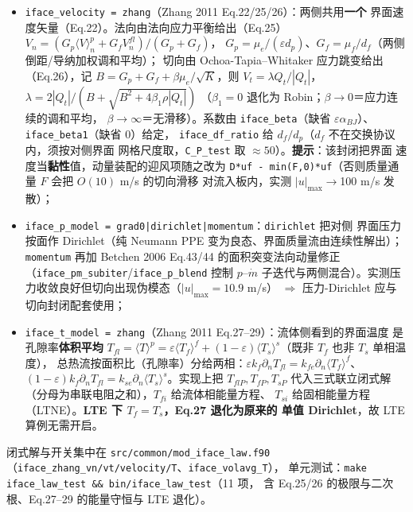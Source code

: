 \documentclass[11pt,a4paper]{ctexart}
\begin{document}
\begin{itemize}\itemsep3pt
  \item \texttt{iface\_velocity = zhang}（Zhang 2011 Eq.22/25/26）：两侧共用\textbf{一个}
        界面速度矢量（Eq.22）。法向由法向应力平衡给出（Eq.25）
        $V_n=(G_p\langle V\rangle_n^p+G_fV_n^{fl})/(G_p+G_f)$，
        $G_p=\mu_e/(\varepsilon d_p)$、$G_f=\mu_f/d_f$（两侧倒距/导纳加权调和平均）；
        切向由 Ochoa-Tapia--Whitaker 应力跳变给出（Eq.26），记
        $B=G_p+G_f+\beta\mu_e/\sqrt K$，则 $V_t=\lambda Q_t/|Q_t|$，
        $\lambda=2|Q_t|/(B+\sqrt{B^2+4\beta_1\rho|Q_t|})$
        （$\beta_1=0$ 退化为 Robin；$\beta\to0$＝应力连续的调和平均，
        $\beta\to\infty$＝无滑移）。系数由 \texttt{iface\_beta}（缺省
        $\varepsilon\alpha_{BJ}$）、\texttt{iface\_beta1}（缺省 0）给定，
        \texttt{iface\_df\_ratio} 给 $d_f/d_p$（$d_f$ 不在交换协议内，须按对侧界面
        网格尺度取，\texttt{C\_P\_test} 取 $\approx50$）。\textbf{提示}：该封闭把界面
        速度当\textbf{黏性}值，动量装配的迎风项随之改为
        \texttt{D*uf - min(F,0)*uf}（否则质量通量 $F$ 会把 $O(10)$ m/s 的切向滑移
        对流入板内，实测 $|u|_{\max}\to$100 m/s 发散）；
  \item \texttt{iface\_p\_model = grad0|dirichlet|momentum}：\texttt{dirichlet} 把对侧
        界面压力按面作 Dirichlet（纯 Neumann PPE 变为良态、界面质量流由连续性解出）；
        \texttt{momentum} 再加 Betchen 2006 Eq.43/44 的面积突变法向动量修正
        （\texttt{iface\_pm\_subiter}/\texttt{iface\_p\_blend} 控制 $p$--$\dot m$
        子迭代与两侧混合）。实测压力收敛良好但切向出现伪模态（$|u|_{\max}=10.9$ m/s）
        $\Rightarrow$ 压力-Dirichlet 应与切向封闭配套使用；
  \item \texttt{iface\_t\_model = zhang}（Zhang 2011 Eq.27--29）：流体侧看到的界面温度
        是孔隙率\textbf{体积平均}
        $T_{fl}=\langle T\rangle^p=\varepsilon\langle T_f\rangle^f
        +(1-\varepsilon)\langle T_s\rangle^s$（既非 $T_f$ 也非 $T_s$ 单相温度），
        总热流按面积比（孔隙率）分给两相：$\varepsilon k_f\partial_nT_{fl}
        =k_{fe}\partial_n\langle T_f\rangle^f$、$(1-\varepsilon)k_f\partial_nT_{fl}
        =k_{se}\partial_n\langle T_s\rangle^s$。实现上把 $T_{flP},T_{fP},T_{sP}$
        代入三式联立闭式解（分母为串联电阻之和），$T_{fi}$ 给流体相能量方程、
        $T_{si}$ 给固相能量方程（LTNE）。\textbf{LTE 下 $T_f=T_s$，Eq.27 退化为原来的
        单值 Dirichlet}，故 LTE 算例无需开启。
\end{itemize}

闭式解与开关集中在 \texttt{src/common/mod\_iface\_law.f90}
（\texttt{iface\_zhang\_vn/vt/velocity/T}、\texttt{iface\_volavg\_T}），
单元测试：\texttt{make iface\_law\_test \&\& bin/iface\_law\_test}（11 项，
含 Eq.25/26 的极限与二次根、Eq.27--29 的能量守恒与 LTE 退化）。
\end{document}
